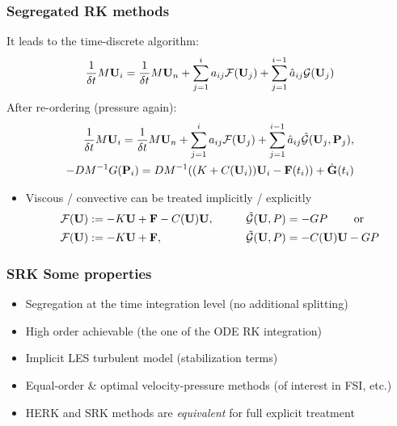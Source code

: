 \begin{frame}
\frametitle{Segregated RK methods}
It leads to the time-discrete algorithm:
\begin{align*}
\frac{1}{\delta t}M{\bf U}_i=\frac{1}{\delta t}M{\bf U}_n+\sum_{j=1}^ia_{ij}\mathcal{F}({\bf U}_j)+\sum_{j=1}^{i-1}\hat{a}_{ij}\mathcal{G}({\bf U}_j)
\end{align*}
After re-ordering (pressure again):
\begin{align*}
\frac{1}{\delta t}M{\bf U}_i=\frac{1}{\delta t}M{\bf U}_n+\sum_{j=1}^ia_{ij}\mathcal{F}({\bf U}_j)+\sum_{j=1}^{i-1}\hat{a}_{ij}  \tilde{\mathcal{G}}({\bf U}_j,{\bf P}_j),\\
- DM^{-1}G ({\bf P}_i)=DM^{-1}((K+C({\bf U}_i)){\bf U}_i - {\bf F}(t_i)) +\dot{\mathbf{G}}(t_i)
\end{align*}
\begin{overprint}
\begin{itemize}
\item Viscous / convective can be treated implicitly / explicitly
\begin{align*}
&\mathcal{F}({\bf U}) :=-K{\bf U} + {\bf F} - C({\bf U}){\bf U}, \qquad &&\tilde{\mathcal{G}}({\bf U},P) = -G P \qquad 
\hbox{ or } \\
&\mathcal{F}({\bf U}) :=-K{\bf U} + {\bf F},  \qquad && \tilde{\mathcal{G}}({\bf U},P) = - C({\bf U}){\bf U} - G P
\end{align*}
\end{itemize}
\end{overprint}
\end{frame}
\begin{frame}
\frametitle{SRK Some properties}
\vfill
\begin{itemize}
\item Segregation at the time integration level (no additional splitting)
\item High order achievable (the one of the ODE RK integration)
\item Implicit LES turbulent model (stabilization terms)
\item Equal-order \& optimal velocity-pressure methods (of interest in FSI, etc.)
\item HERK and SRK methods are \emph{equivalent} for full explicit treatment
\end{itemize}
\vfill
\end{frame}

